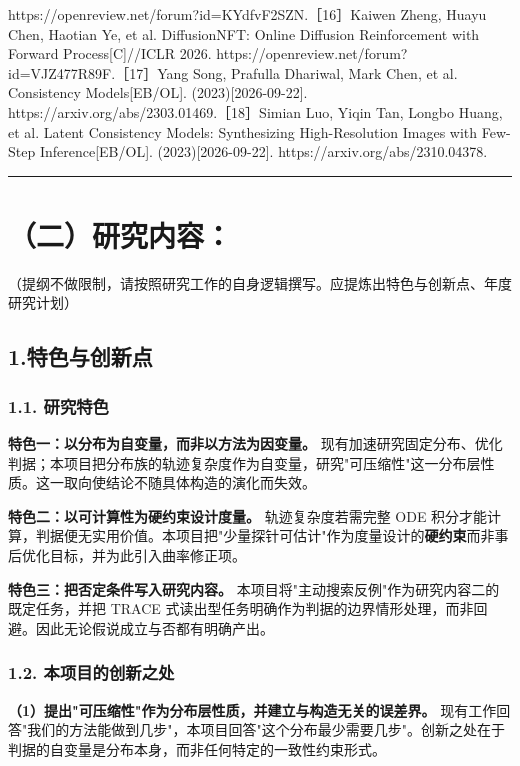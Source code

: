 \documentclass[12pt,a4paper]{ctexart}
\begin{document}
https://openreview.net/forum?id=KYdfvF2SZN.［16］Kaiwen Zheng, Huayu Chen, Haotian Ye, et al. DiffusionNFT: Online Diffusion Reinforcement with Forward Process[C]//ICLR 2026. https://openreview.net/forum?id=VJZ477R89F.［17］Yang Song, Prafulla Dhariwal, Mark Chen, et al. Consistency Models[EB/OL]. (2023)[2026-09-22]. https://arxiv.org/abs/2303.01469.［18］Simian Luo, Yiqin Tan, Longbo Huang, et al. Latent Consistency Models: Synthesizing High-Resolution Images with Few-Step Inference[EB/OL]. (2023)[2026-09-22]. https://arxiv.org/abs/2310.04378.

\vspace{4pt}\noindent\rule{\linewidth}{0.4pt}\vspace{4pt}

\section*{（二）研究内容：}

（提纲不做限制，请按照研究工作的自身逻辑撰写。应提炼出特色与创新点、年度研究计划）

\subsection*{1.特色与创新点}

\subsubsection*{1.1. 研究特色}

\textbf{特色一：以分布为自变量，而非以方法为因变量。} 现有加速研究固定分布、优化判据；本项目把分布族的轨迹复杂度作为自变量，研究"可压缩性"这一分布层性质。这一取向使结论不随具体构造的演化而失效。

\textbf{特色二：以可计算性为硬约束设计度量。} 轨迹复杂度若需完整 ODE 积分才能计算，判据便无实用价值。本项目把"少量探针可估计"作为度量设计的\textbf{硬约束}而非事后优化目标，并为此引入曲率修正项。

\textbf{特色三：把否定条件写入研究内容。} 本项目将"主动搜索反例"作为研究内容二的既定任务，并把 TRACE 式读出型任务明确作为判据的边界情形处理，而非回避。因此无论假说成立与否都有明确产出。

\subsubsection*{1.2. 本项目的创新之处}

\textbf{（1）提出"可压缩性"作为分布层性质，并建立与构造无关的误差界。} 现有工作回答"我们的方法能做到几步"，本项目回答"这个分布最少需要几步"。创新之处在于判据的自变量是分布本身，而非任何特定的一致性约束形式。
\end{document}
